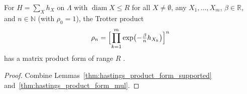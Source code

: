 \begin{lemma}
    \label{thm:hastings_trotter_product_form}
    \leanok
    For $H=\sum_Xh_X$ on $\Lambda$ with $\operatorname{diam}X\le R$ for all
    $X\ne\emptyset$, any $X_1,\dots,X_m$, $\beta\in\mathbb R$, and
    $n\in\mathbb N$ (with $\rho_0=1$), the Trotter product
    \begin{align}
        \label{eq:hastings_trotter_product}
        \rho_n=\Bigl[\prod_{k=1}^{m}\exp\bigl(-\tfrac{\beta}{n}h_{X_k}\bigr)
            \Bigr]^n
    \end{align}
    has a matrix product form of range $R$
    \cite[lines 1048--1077]{Hastings2006Solving}.
\end{lemma}
\begin{proof}\leanok
    Combine Lemmas~\ref{thm:hastings_product_form_supported}
    and~\ref{thm:hastings_product_form_mul}.
\end{proof}
